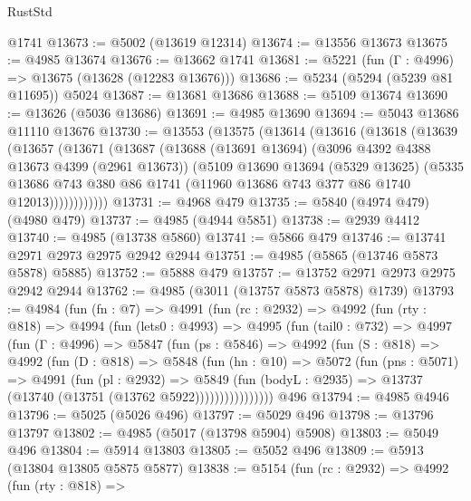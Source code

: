 \begin{lexlean}{RustStd}
\begin{coremodule}
    @1741
@13673 := @5002 (@13619 @12314)
@13674 := @13556 @13673
@13675 := @4985 @13674
@13676 := @13662 @1741
@13681 := @5221 (fun (Γ : @4996) => @13675 (@13628 (@12283 @13676)))
@13686 := @5234 (@5294 (@5239 @81 @11695)) @5024
@13687 := @13681 @13686
@13688 := @5109 @13674
@13690 := @13626 (@5036 @13686)
@13691 := @4985 @13690
@13694 := @5043 @13686 @11110 @13676
@13730 := @13553
    (@13575
      (@13614
        (@13616
          (@13618
            (@13639
              (@13657
                (@13671
                  (@13687
                    (@13688
                      (@13691 @13694)
                      (@3096 @4392 @4388 @13673 @4399 (@2961 @13673))
                      (@5109
                        @13690
                        @13694
                        (@5329 @13625)
                        (@5335
                          @13686
                          @743
                          @380
                          @86
                          @1741
                          (@11960 @13686 @743 @377 @86 @1740 @12013))))))))))))
@13731 := @4968 @479
@13735 := @5840 (@4974 @479) (@4980 @479)
@13737 := @4985 (@4944 @5851)
@13738 := @2939 @4412
@13740 := @4985 (@13738 @5860)
@13741 := @5866 @479
@13746 := @13741 @2971 @2973 @2975 @2942 @2944
@13751 := @4985 (@5865 (@13746 @5873 @5878) @5885)
@13752 := @5888 @479
@13757 := @13752 @2971 @2973 @2975 @2942 @2944
@13762 := @4985 (@3011 (@13757 @5873 @5878) @1739)
@13793 := @4984
    (fun (fn : @7) =>
    @4991
      (fun (rc : @2932) =>
      @4992
        (fun (rty : @818) =>
        @4994
          (fun (lets0 : @4993) =>
          @4995
            (fun (tail0 : @732) =>
            @4997
              (fun (Γ : @4996) =>
              @5847
                (fun (ps : @5846) =>
                @4992
                  (fun (S : @818) =>
                  @4992
                    (fun (D : @818) =>
                    @5848
                      (fun (hn : @10) =>
                      @5072
                        (fun (pns : @5071) =>
                        @4991
                          (fun (pl : @2932) =>
                          @5849
                            (fun (bodyL : @2935) =>
                            @13737 (@13740 (@13751 (@13762 @5922))))))))))))))))
    @496
@13794 := @4985 @4946
@13796 := @5025 (@5026 @496)
@13797 := @5029 @496
@13798 := @13796 @13797
@13802 := @4985 (@5017 (@13798 @5904) @5908)
@13803 := @5049 @496
@13804 := @5914 @13803
@13805 := @5052 @496
@13809 := @5913 (@13804 @13805 @5875 @5877)
@13838 := @5154
    (fun (rc : @2932) =>
    @4992
      (fun (rty : @818) =>

\end{coremodule}
\end{lexlean}
